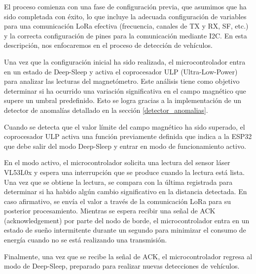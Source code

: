 





El proceso comienza con una fase de configuración previa, que asumimos que ha sido completada con éxito, lo que incluye la adecuada configuración de variables para una comunicación LoRa efectiva (frecuencia, canales de TX y RX, SF, etc.) y la correcta configuración de pines para la comunicación mediante I2C. En esta descripción, nos enfocaremos en el proceso de detección de vehículos.


Una vez que la configuración inicial ha sido realizada, el microcontrolador entra en un estado de Deep-Sleep y activa el coprocesador ULP (Ultra-Low-Power) para analizar las lecturas del magnetómetro. Este análisis tiene como objetivo determinar si ha ocurrido una variación significativa en el campo magnético que supere un umbral predefinido. Esto se logra gracias a la implementación de un detector de anomalías detallado en la sección \ref{detector_anomalias}.



Cuando se detecta que el valor límite del campo magnético ha sido superado, el coprocesador ULP activa una función previamente definida que indica a la ESP32 que debe salir del modo Deep-Sleep y entrar en modo de funcionamiento activo.

En el modo activo, el microcontrolador solicita una lectura del sensor láser VL53L0x y espera una interrupción que se produce cuando la lectura está lista. Una vez que se obtiene la lectura, se compara con la última registrada para determinar si ha habido algún cambio significativo en la distancia detectada. En caso afirmativo, se envía el valor a través de la comunicación LoRa para su posterior procesamiento. Mientras se espera recibir una señal de ACK (acknowledgement) por parte del nodo de borde, el microcontrolador entra en un estado de sueño intermitente durante un segundo para minimizar el consumo de energía cuando no se está realizando una transmisión.

Finalmente, una vez que se recibe la señal de ACK, el microcontrolador regresa al modo de Deep-Sleep, preparado para realizar nuevas detecciones de vehículos.

